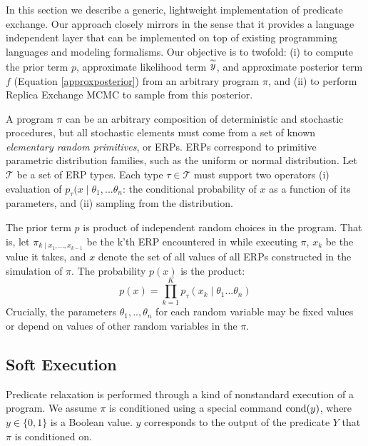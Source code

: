 
In this section we describe a generic, lightweight implementation of predicate exchange.
Our approach closely mirrors \citep{wingate2011lightweight, milch20071} in the sense that it provides a language independent layer that can be implemented on top of existing programming languages and modeling formalisms.
Our objective is to twofold: (i) to compute the prior term $p$, approximate likelihood term $\stackrel{\sim}{y}$, and approximate posterior term $f$ (Equation \ref{approxposterior}) from an arbitrary program $\pi$, and (ii) to perform Replica Exchange MCMC to sample from this posterior.

A program $\pi$ can be an arbitrary composition of deterministic and stochastic procedures, but all stochastic elements must come from a set of known \emph{elementary random primitives}, or ERPs.
ERPs correspond to primitive parametric distribution families, such as the uniform or normal distribution.
Let $\mathcal{T}$ be a set of ERP types.
Each type $\tau \in \mathcal{T}$ must support two operators (i) evaluation of $p_\tau(x \mid \theta_1, ... \theta_n$: the conditional probability of $x$ as a function of its parameters, and (ii) sampling from the distribution.

The prior term $p$ is product of independent random choices in the program. 
That is, let $\pi_{k \mid x_1, ..., x_{k-1}}$ be the k'th ERP encountered in while executing $\pi$, $x_k$ be the value it takes, and $x$ denote the set of all values of all ERPs constructed in the simulation of $\pi$.
The probability $p(x)$ is the product:
\begin{equation}
p(x) = \prod_{k=1}^K p_\tau(x_k \mid \theta_1... \theta_n )
\end{equation}
Crucially, the parameters $\theta_1,..,\theta_n$ for each random variable may be fixed values or depend on values of other random variables in the $\pi$.

\subsection{Soft Execution}
Predicate relaxation is performed through a kind of nonstandard execution of a program.
We assume $\pi$ is conditioned using a special command $\operatorname{cond}(y)$, where $y \in \{0,1\}$ is a Boolean value.
$y$ corresponds to the output of the predicate $Y$ that $\pi$ is conditioned on.

